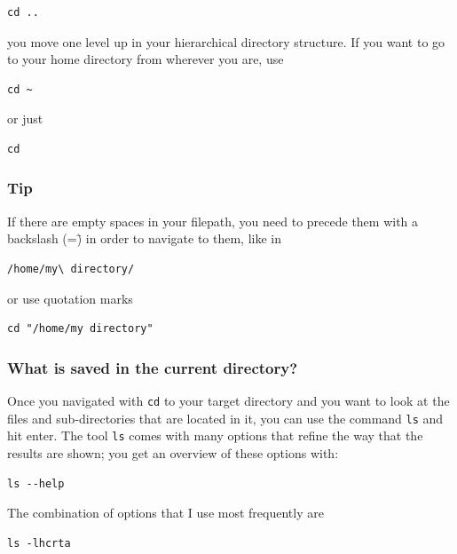 \documentclass[11pt]{article}
\begin{document}
\begin{verbatim}
cd ..
\end{verbatim}

 you move one level up in your hierarchical directory structure.  If
 you want to go to your home directory from wherever you are, use


\begin{verbatim}
cd ~
\end{verbatim}

 or just
 

\begin{verbatim}
cd
\end{verbatim}
\subsubsection{Tip}
\label{sec-2-1-3}

If there are empty spaces in your filepath, you need to precede them
with a backslash (=\=) in order to navigate to them, like in 


\begin{verbatim}
/home/my\ directory/
\end{verbatim}

or use quotation marks


\begin{verbatim}
cd "/home/my directory"
\end{verbatim}
\subsubsection{What is saved in the current directory?}
\label{sec-2-1-4}

 Once you navigated with \texttt{cd} to your target directory and you want to
 look at the files and sub-directories that are located in it, you can
 use the command \texttt{ls} and hit enter. The tool \texttt{ls} comes with many
 options that refine the way that the results are shown; you get an
 overview of these options with:


\begin{verbatim}
ls --help
\end{verbatim}

 The combination of options that I use most frequently are


\begin{verbatim}
ls -lhcrta
\end{verbatim}
\end{document}
